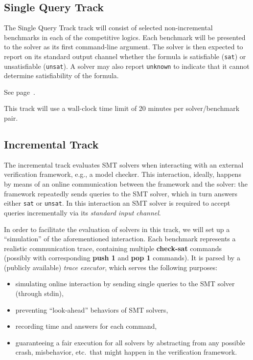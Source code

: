 \documentclass[12pt]{article}
\newcommand{\akey}[1]{\textbf{#1}\xspace}
\newcommand{\maintrack}{Single Query Track\xspace}
\begin{document}
\subsection{\maintrack}
\label{sec:exec:single}

The \maintrack track will consist of selected non-incremental benchmarks in
each of the competitive logics. Each benchmark will be presented to
the solver as its first command-line argument.  The solver is then expected to
report on its standard output channel whether the formula is satisfiable
(\texttt{sat}) or unsatisfiable (\texttt{unsat}).  A solver may also report
\texttt{unknown} to indicate that it cannot determine satisfiability of the
formula.

 See page~\pageref{benchmark-selection}.

This track will use a wall-clock time limit of 20 minutes per solver/benchmark
pair.

\subsection{Incremental Track}
\label{sec:exec:app}

The incremental track evaluates SMT solvers when interacting with an
external verification framework, e.g., a model checker. This
interaction, ideally, happens by means of an online communication
between the framework and the solver: the framework repeatedly sends
queries to the SMT solver, which in turn answers either \texttt{sat}
or \texttt{unsat}.  In this interaction an SMT solver is required to
accept queries incrementally via its \emph{standard input channel}.

In order to facilitate the evaluation of solvers in this track, we will set up
a ``simulation'' of the aforementioned interaction.  Each benchmark represents
a realistic communication trace, containing multiple \akey{check-sat} commands
(possibly with corresponding \akey{push 1} and \akey{pop 1} commands). It is
parsed by a (publicly available) \emph{trace executor},
which serves the following purposes:

\begin{itemize}
  \item simulating online interaction by sending single queries to the SMT
    solver (through stdin),
  \item preventing ``look-ahead'' behaviors of SMT solvers,
  \item recording time and answers for each command,
  \item guaranteeing a fair execution for all solvers by abstracting
  from any possible crash, misbehavior, etc.\ that might happen in the
  verification framework.
\end{itemize}
\end{document}
